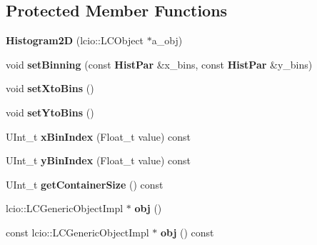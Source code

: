 \subsection*{Protected Member Functions}
\begin{DoxyCompactItemize}
\item 
{\bfseries Histogram2\-D} (lcio\-::\-L\-C\-Object $\ast$a\-\_\-obj)\label{classhistmgr_1_1Histogram2D_ade05eeddf75a2b5e341194c77fb9d101}

\item 
void {\bfseries set\-Binning} (const {\bf Hist\-Par} \&x\-\_\-bins, const {\bf Hist\-Par} \&y\-\_\-bins)\label{classhistmgr_1_1Histogram2D_a5599afe22a258e379309225ba43b8fd3}

\item 
void {\bfseries set\-Xto\-Bins} ()\label{classhistmgr_1_1Histogram2D_a56dc039a37aa7bf88366e72e38535d9b}

\item 
void {\bfseries set\-Yto\-Bins} ()\label{classhistmgr_1_1Histogram2D_adfafff46dede8944cb1a7569e864a1a2}

\item 
U\-Int\-\_\-t {\bfseries x\-Bin\-Index} (Float\-\_\-t value) const \label{classhistmgr_1_1Histogram2D_af1dab9a3f3ef0c7f015934014fbb6118}

\item 
U\-Int\-\_\-t {\bfseries y\-Bin\-Index} (Float\-\_\-t value) const \label{classhistmgr_1_1Histogram2D_abc60652d0255c12f81b5ac270f28e744}

\item 
U\-Int\-\_\-t {\bfseries get\-Container\-Size} () const \label{classhistmgr_1_1Histogram2D_adc5826e91c1e1b571fb9a1a0c3cbdadf}

\item 
lcio\-::\-L\-C\-Generic\-Object\-Impl $\ast$ {\bfseries obj} ()\label{classhistmgr_1_1Histogram2D_a858dc3152e69254166a94bd9da833be3}

\item 
const lcio\-::\-L\-C\-Generic\-Object\-Impl $\ast$ {\bfseries obj} () const \label{classhistmgr_1_1Histogram2D_a727d937e500b3a05a8c1d9d197198bfb}

\end{DoxyCompactItemize}
